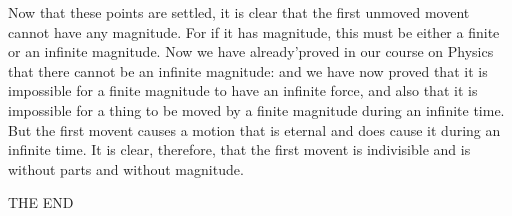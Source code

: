 Now that these points are settled, it is clear that the first unmoved
movent cannot have any magnitude. For if it has magnitude, this must
be either a finite or an infinite magnitude. Now we have already'proved
in our course on Physics that there cannot be an infinite magnitude:
and we have now proved that it is impossible for a finite magnitude
to have an infinite force, and also that it is impossible for a thing
to be moved by a finite magnitude during an infinite time. But the
first movent causes a motion that is eternal and does cause it during
an infinite time. It is clear, therefore, that the first movent is
indivisible and is without parts and without magnitude. 

THE END

